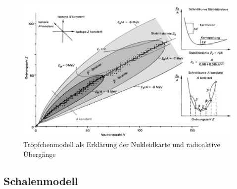 \documentclass[twocolumn]{summery_4.1}
\begin{document}
\begin{figure}[H]
    \centering
    \includegraphics[width=.49\textwidth]{Kernenergien.png}
    \caption{Tröpfchenmodell als Erklärung der Nukleidkarte und radioaktive Übergänge}
\end{figure}

\subsection{Schalenmodell}
\end{document}
